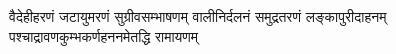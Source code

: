 
{वैदेहीहरणं जटायुमरणं सुग्रीवसम्भाषणम्}
{वालीनिर्दलनं समुद्रतरणं लङ्कापुरीदाहनम्}
{पश्चाद्रावणकुम्भकर्णहननमेतद्धि रामायणम्}